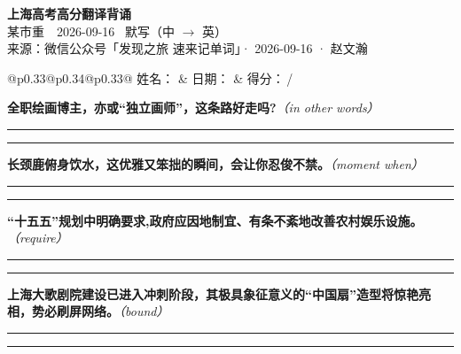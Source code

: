 \documentclass[11pt,a4paper]{article}
\newcommand{\num}[1]{\makebox[1.9em][r]{#1.}\hspace{0.3em}}
\newcommand{\wline}{\noindent\rule{\linewidth}{0.4pt}}
\newcommand{\prompt}[1]{\emph{\textcolor{tipblue}{\small（#1）}}}
\begin{document}
\pagestyle{plain}
\begin{center}
{\LARGE\bfseries 上海高考高分翻译背诵 }\\[0.25em]
{\large 某市重　2026-09-16 \quad\ 默写（中 $\to$ 英）}\\[0.35em]
{\footnotesize 来源：微信公众号「发现之旅 速来记单词」· 2026-09-16 · 赵文瀚}
\end{center}

\vspace{0.4em}
\noindent\begin{tabular}{@{}p{0.33\textwidth}@{}p{0.34\textwidth}@{}p{0.33\textwidth}@{}}
姓名：\underline{\hspace{2.0cm}} & 日期：\underline{\hspace{2.0cm}} & 得分：\underline{\hspace{1.4cm}}\,/ \\
\end{tabular}

\vspace{0.5em}

\vspace{0.8em}
\num{1}\textbf{全职绘画博主，亦或“独立画师”，这条路好走吗?}\prompt{in other words}

\vspace{0.3em}

\wline\vspace{0.3em}
\wline

\num{2}\textbf{长颈鹿俯身饮水，这优雅又笨拙的瞬间，会让你忍俊不禁。}\prompt{moment when}

\vspace{0.3em}

\wline\vspace{0.3em}
\wline

\num{3}\textbf{“十五五”规划中明确要求,政府应因地制宜、有条不紊地改善农村娱乐设施。}\prompt{require}

\vspace{0.3em}

\wline\vspace{0.3em}
\wline

\num{4}\textbf{上海大歌剧院建设已进入冲刺阶段，其极具象征意义的“中国扇”造型将惊艳亮相，势必刷屏网络。}\prompt{bound}

\vspace{0.3em}

\wline\vspace{0.3em}
\wline
\end{document}

